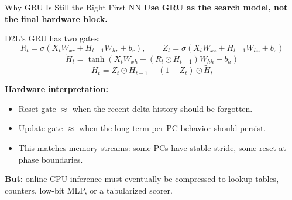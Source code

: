 \documentclass[10pt,aspectratio=169]{beamer}
\begin{document}
\begin{frame}{Why GRU Is Still the Right First NN}
  \textbf{Use GRU as the search model, not the final hardware block.}

  \vspace{0.3em}
  D2L's GRU has two gates:
  \[
  R_t = \sigma(X_t W_{xr} + H_{t-1}W_{hr}+b_r),\qquad
  Z_t = \sigma(X_t W_{xz} + H_{t-1}W_{hz}+b_z)
  \]
  \[
  \tilde{H}_t = \tanh(X_t W_{xh} + (R_t \odot H_{t-1})W_{hh}+b_h)
  \]
  \[
  H_t = Z_t\odot H_{t-1} + (1-Z_t)\odot\tilde{H}_t
  \]

  \vspace{0.3em}
  \textbf{Hardware interpretation:}
  \begin{itemize}
    \item Reset gate $\approx$ when the recent delta history should be forgotten.
    \item Update gate $\approx$ when the long-term per-PC behavior should persist.
    \item This matches memory streams: some PCs have stable stride, some reset at phase boundaries.
  \end{itemize}

  \vspace{0.3em}
  \textbf{But:} online CPU inference must eventually be compressed to lookup tables, counters, low-bit MLP, or a tabularized scorer.
\end{frame}
\end{document}
